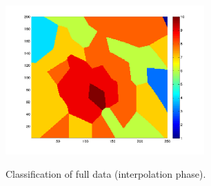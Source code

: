 \documentclass[pre,twocolumn,twoside,byrevtex,superscriptaddress]{revtex4}
\begin{document}
    \begin{figure}
      \centering
      \includegraphics[width=0.68\textwidth]{116-standard.png}
      \label{fig:6}
      \caption{Classification of full data (interpolation phase).}
    \end{figure}
\end{document}
